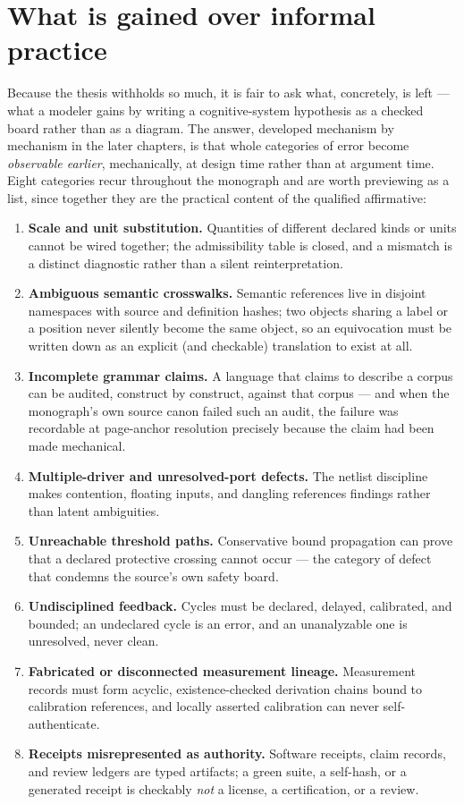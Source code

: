 \section{What is gained over informal practice}\label{ch01:gained}

Because the thesis withholds so much, it is fair to ask what, concretely,
is left --- what a modeler gains by writing a cognitive-system hypothesis
as a checked board rather than as a diagram. The answer, developed
mechanism by mechanism in the later chapters, is that whole categories of
error become \emph{observable earlier}, mechanically, at design time
rather than at argument time. Eight categories recur throughout the
monograph and are worth previewing as a list, since together they are the
practical content of the qualified affirmative:

\begin{enumerate}
\item \textbf{Scale and unit substitution.} Quantities of different
declared kinds or units cannot be wired together; the admissibility table
is closed, and a mismatch is a distinct diagnostic rather than a silent
reinterpretation.
\item \textbf{Ambiguous semantic crosswalks.} Semantic references live in
disjoint namespaces with source and definition hashes; two objects sharing
a label or a position never silently become the same object, so an
equivocation must be written down as an explicit (and checkable)
translation to exist at all.
\item \textbf{Incomplete grammar claims.} A language that claims to
describe a corpus can be audited, construct by construct, against that
corpus --- and when the monograph's own source canon failed such an audit,
the failure was recordable at page-anchor resolution precisely because the
claim had been made mechanical.
\item \textbf{Multiple-driver and unresolved-port defects.} The netlist
discipline makes contention, floating inputs, and dangling references
findings rather than latent ambiguities.
\item \textbf{Unreachable threshold paths.} Conservative bound propagation
can prove that a declared protective crossing cannot occur --- the
category of defect that condemns the source's own safety board.
\item \textbf{Undisciplined feedback.} Cycles must be declared, delayed,
calibrated, and bounded; an undeclared cycle is an error, and an
unanalyzable one is unresolved, never clean.
\item \textbf{Fabricated or disconnected measurement lineage.} Measurement
records must form acyclic, existence-checked derivation chains bound to
calibration references, and locally asserted calibration can never
self-authenticate.
\item \textbf{Receipts misrepresented as authority.} Software receipts,
claim records, and review ledgers are typed artifacts; a green suite, a
self-hash, or a generated receipt is checkably \emph{not} a license, a
certification, or a review.
\end{enumerate}

